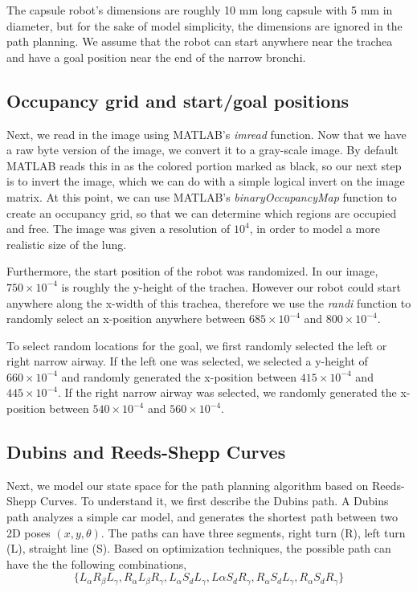 \documentclass[conference]{IEEEtran}
\begin{document}
The capsule robot's dimensions are roughly 10 mm long capsule with 5 mm in diameter,
but for the sake of model simplicity, the dimensions are ignored in the
path planning. We assume that the robot can start anywhere near the trachea
and have a goal position near the end of the narrow bronchi.

\subsection{Occupancy grid and start/goal positions}

Next, we read in the image using MATLAB's \textit{imread} function. Now
that we have a raw byte version of the image, we convert it to
a gray-scale image. By default MATLAB reads this in as the colored
portion marked as black, so our next step is to invert the image,
which we can do with a simple logical invert on the image matrix.
At this point, we can use MATLAB's \textit{binaryOccupancyMap} function
to create an occupancy grid, so that we can determine which
regions are occupied and free. The image was given a resolution
of $10^4$, in order to model a more realistic size of the lung.

Furthermore, the start position of the robot was randomized. In our
image, $750 \times 10^{-4}$ is roughly the y-height of the trachea.
However our robot could start anywhere along the x-width of this trachea,
therefore we use the \textit{randi} function to randomly select an
x-position anywhere between $685 \times 10^{-4}$ and $800 \times 10^{-4}$.

To select random locations for the goal, we first randomly selected
the left or right narrow airway. If the left one was selected, we
selected a y-height of $660 \times 10^{-4}$ and randomly generated
the x-position between $415 \times 10^{-4}$ and $445 \times 10^{-4}$.
If the right narrow airway was selected, we randomly generated the x-position
between $540 \times 10^{-4}$ and $560 \times 10^{-4}$.

\subsection{Dubins and Reeds-Shepp Curves}

Next, we model our state space for the path planning algorithm based
on Reeds-Shepp Curves. To understand it, we first describe the Dubins
path. A Dubins path analyzes a simple car model, and generates
the shortest path between two 2D poses $(x, y, \theta)$. The paths
can have three segments, right turn (R), left turn (L), straight line (S).
Based on optimization techniques, the possible path can have the the following combinations,
\[
    \{L_\alpha R_\beta L_\gamma, R_\alpha L_\beta R_\gamma, L_\alpha S_d L_\gamma, L\alpha S_d R_\gamma, R_\alpha S_d L_\gamma, R_\alpha S_d R_\gamma \}
\]
\end{document}
